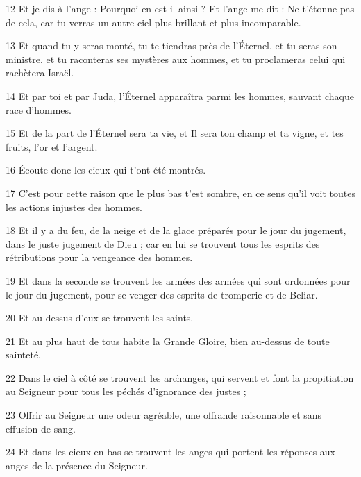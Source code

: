 \par 12 Et je dis à l'ange : Pourquoi en est-il ainsi ? Et l'ange me dit : Ne t'étonne pas de cela, car tu verras un autre ciel plus brillant et plus incomparable.

\par 13 Et quand tu y seras monté, tu te tiendras près de l'Éternel, et tu seras son ministre, et tu raconteras ses mystères aux hommes, et tu proclameras celui qui rachètera Israël.

\par 14 Et par toi et par Juda, l'Éternel apparaîtra parmi les hommes, sauvant chaque race d'hommes.

\par 15 Et de la part de l'Éternel sera ta vie, et Il sera ton champ et ta vigne, et tes fruits, l'or et l'argent.

\par 16 Écoute donc les cieux qui t'ont été montrés.

\par 17 C'est pour cette raison que le plus bas t'est sombre, en ce sens qu'il voit toutes les actions injustes des hommes.

\par 18 Et il y a du feu, de la neige et de la glace préparés pour le jour du jugement, dans le juste jugement de Dieu ; car en lui se trouvent tous les esprits des rétributions pour la vengeance des hommes.

\par 19 Et dans la seconde se trouvent les armées des armées qui sont ordonnées pour le jour du jugement, pour se venger des esprits de tromperie et de Beliar.

\par 20 Et au-dessus d'eux se trouvent les saints.

\par 21 Et au plus haut de tous habite la Grande Gloire, bien au-dessus de toute sainteté.

\par 22 Dans le ciel à côté se trouvent les archanges, qui servent et font la propitiation au Seigneur pour tous les péchés d'ignorance des justes ;

\par 23 Offrir au Seigneur une odeur agréable, une offrande raisonnable et sans effusion de sang.

\par 24 Et dans les cieux en bas se trouvent les anges qui portent les réponses aux anges de la présence du Seigneur.

